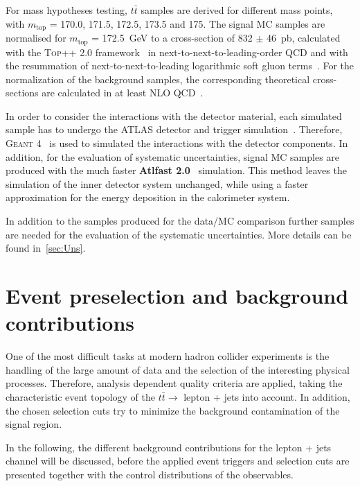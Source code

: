  For mass hypotheses testing, $t\bar{t}$ samples are derived for different mass points, with $m_{\text{top}}$ = 170.0, 171.5, 172.5, 173.5 and 175. The signal MC samples are normalised for $m_{\text{top}}$ = 172.5~GeV to a cross-section of 832 $\pm$ 46~pb, calculated with the \textsc{Top++ 2.0} framework~\cite{Czakon:2011xx} in next-to-next-to-leading-order QCD and with 
the resummation of next-to-next-to-leading logarithmic soft gluon terms~\cite{Cacciari:2011hy,Beneke:2011mq,Baernreuther:2012ws,Czakon:2012zr,Czakon:2013goa}.  For the normalization of the background samples, the corresponding  theoretical cross-sections are calculated in at least NLO  QCD~\cite{Catani:2009sm,Kidonakis:2010tc,Kidonakis:2010ux,Kidonakis:2011wy,Campbell:1999ah,Campbell:2011bn,Alwall:2014hca,deFlorian:2016spz,ATL-PHYS-PUB-2016-003}. 
 



 In order to consider the  interactions with the detector material, each simulated sample has to undergo the ATLAS detector and trigger simulation~\cite{Aad:2010ah}. Therefore, \textsc{Geant 4}~\cite{Agostinelli:2002hh}  is used to simulated the interactions with the detector components.  In addition, for the evaluation of systematic uncertainties, signal MC samples are produced with the much faster \textbf{Atlfast 2.0}~\cite{Richter-Was:683751} simulation. This method leaves the simulation of the inner detector system unchanged, while using a faster approximation for the energy deposition in the calorimeter system.

 In addition to the samples produced for the data/MC comparison further samples are needed for the evaluation of the systematic uncertainties. More details can be found in~\cref{sec:Uns}. 



\section{Event preselection and background contributions}\label{selection}
 One of the most difficult tasks at modern hadron collider experiments is the handling of the large amount of data and the selection of the interesting physical processes. Therefore, analysis dependent quality criteria are applied, taking the characteristic event topology of the  $t\bar{t}\rightarrow$ lepton + jets into account. In addition, the chosen selection cuts try to minimize the background contamination of the signal region. 
 
 In the following, the different background contributions for the lepton + jets channel will be discussed, before the applied event triggers and selection cuts are presented together with the control distributions of the observables.
 
